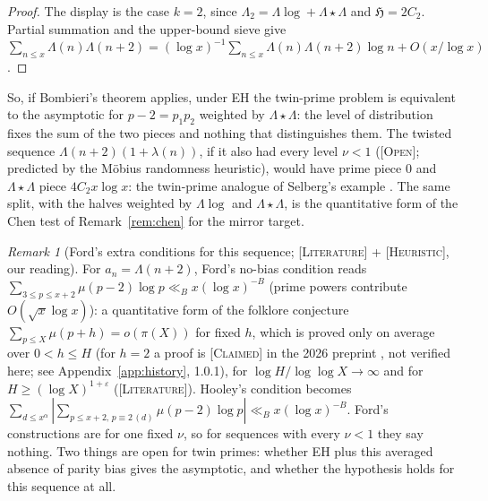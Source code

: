 \documentclass[11pt]{amsart}
\theoremstyle{definition}
\theoremstyle{remark}
\newtheorem{remark}[theorem]{Remark}
\newcommand{\lbl}[1]{\textup{\textsc{[#1]}}}
\begin{document}
\begin{proof}
The display is the case $k=2$, since $\Lambda_2=\Lambda\log+\Lambda\star\Lambda$
and $\mathfrak H=2C_2$. Partial summation and the upper-bound sieve give
$\sum_{n\le x}\Lambda(n)\Lambda(n+2)=(\log x)^{-1}\sum_{n\le
x}\Lambda(n)\Lambda(n+2)\log n+O(x/\log x)$.
\end{proof}

So, if Bombieri's theorem applies, under EH the twin-prime problem is
equivalent to the asymptotic for $p-2=p_1p_2$ weighted by
$\Lambda\star\Lambda$: the level of distribution fixes the sum of the two pieces
and nothing that distinguishes them. The twisted sequence
$\Lambda(n+2)(1+\lambda(n))$, if it also had every level $\nu<1$
(\lbl{Open}; predicted by the M\"obius randomness heuristic), would have prime
piece $0$ and $\Lambda\star\Lambda$ piece $4C_2x\log x$: the twin-prime analogue of
Selberg's example \cite[p.~2]{Fo04}. The same split, with the halves weighted
by $\Lambda\log$ and $\Lambda\star\Lambda$, is the quantitative form of the Chen
test of Remark~\ref{rem:chen} for the mirror target.

\begin{remark}[Ford's extra conditions for this sequence; \lbl{Literature} + \lbl{Heuristic}, our reading]\label{rem:ford-twin}
For $a_n=\Lambda(n+2)$, Ford's no-bias condition reads
$\sum_{3\le p\le x+2}\mu(p-2)\log p\ll_Bx(\log x)^{-B}$ (prime powers contribute
$O(\sqrt x\log x)$): a quantitative form of the folklore conjecture
$\sum_{p\le X}\mu(p+h)=o(\pi(X))$ for fixed $h$, which is proved only on average
over $0<h\le H$ (for $h=2$ a proof is \lbl{Claimed} in the 2026 preprint
\cite{LWW26}, not verified here; see Appendix~\ref{app:history}, 1.0.1), for $\log H/\log\log X\to\infty$ \cite[Theorem~1.1]{Li21} and for
$H\ge(\log X)^{1+\varepsilon}$ \cite[Cor.~1.4]{LT22} (\lbl{Literature}).
Hooley's condition becomes
$\sum_{d\le x^\alpha}\left|\sum_{p\le x+2,\,p\equiv2\,(d)}\mu(p-2)\log p\right|\ll_Bx(\log x)^{-B}$.
Ford's constructions are for one fixed $\nu$, so for sequences with every
$\nu<1$ they say nothing. Two things are open for twin primes: whether EH plus
this averaged absence of parity bias gives the asymptotic, and whether the
hypothesis holds for this sequence at all.
\end{remark}
\end{document}

